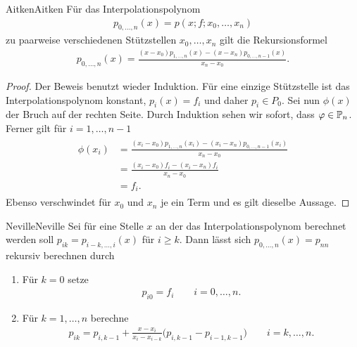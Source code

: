 \begin{Lemma*}{Aitken}{Aitken}
  Für das Interpolationspolynom
  \begin{gather}
    p_{0,\dots,n}(x) = p(x;f;x_0,\dots,x_n)
  \end{gather}
  zu paarweise verschiedenen Stützstellen $x_0,\dots,x_n$ gilt die
  Rekursionsformel
  \begin{gather}
    p_{0,\dots,n}(x)
    = \frac{(x-x_0) p_{1,\dots,n}(x) - (x-x_n) p_{0,\dots,n-1}(x)}{x_n-x_0}.
  \end{gather}
\end{Lemma*}

\begin{proof}
  Der Beweis benutzt wieder Induktion. Für eine einzige Stützstelle ist das Interpolationspolynom konstant, $p_i(x) = f_i$ und daher $p_i\in P_0$.
  Sei nun $\phi(x)$ der Bruch auf der rechten Seite. Durch Induktion sehen wir sofort, dass $\phi\in \P_n$. Ferner gilt für $i=1,\dots,n-1$
  \begin{gather}
    \begin{split}
      \phi(x_i)
      &= \frac{(x_i-x_0) p_{1,\dots,n}(x_i) - (x_i-x_n)p_{0,\dots,n-1}(x_i)}{x_n-x_0}\\
      &= \frac{(x_i-x_0) f_i - (x_i-x_n) f_i}{x_n-x_0}\\
      &= f_i.
    \end{split}
  \end{gather}
  Ebenso verschwindet für $x_0$ und $x_n$ je ein Term und es gilt
  dieselbe Aussage.
\end{proof}

\begin{Algorithmus*}{Neville}{Neville}
  Sei für eine Stelle $x$ an der das Interpolationspolynom berechnet
  werden soll $p_{ik} = p_{i-k,\dots,i}(x)$ für $i\ge k$. Dann lässt
  sich $p_{0,\dots,n}(x) = p_{nn}$ rekursiv berechnen durch
  \begin{enumerate}
  \item Für $k=0$ setze
    \begin{gather}
      p_{i0} = f_i \qquad i=0,\dots,n.
    \end{gather}
  \item Für $k=1,\dots,n$ berechne
    \begin{gather}
      p_{ik} = p_{i,k-1} + \frac{x-x_i}{x_i-x_{i-k}}
      \bigl( p_{i,k-1} - p_{i-1,k-1} \bigr)
      \qquad i=k,\dots,n.
    \end{gather}
  \end{enumerate}
\end{Algorithmus*}

